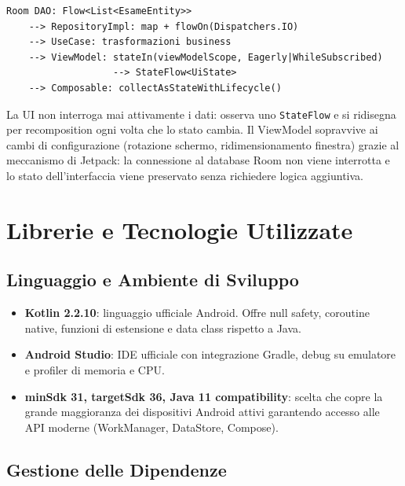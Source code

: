 \documentclass[a4paper,12pt]{report}
\begin{document}
    \begin{lstlisting}[language={},basicstyle=\ttfamily\small]
Room DAO: Flow<List<EsameEntity>>
    --> RepositoryImpl: map + flowOn(Dispatchers.IO)
    --> UseCase: trasformazioni business
    --> ViewModel: stateIn(viewModelScope, Eagerly|WhileSubscribed)
                   --> StateFlow<UiState>
    --> Composable: collectAsStateWithLifecycle()
    \end{lstlisting}

    La UI non interroga mai attivamente i dati: osserva uno \texttt{StateFlow}
    e si ridisegna per recomposition ogni volta che lo stato cambia.
    Il ViewModel sopravvive ai cambi di configurazione (rotazione schermo,
    ridimensionamento finestra) grazie al meccanismo di Jetpack: la connessione
    al database Room non viene interrotta e lo stato dell'interfaccia viene
    preservato senza richiedere logica aggiuntiva.

    \section{Librerie e Tecnologie Utilizzate}

    \subsection{Linguaggio e Ambiente di Sviluppo}

    \begin{itemize}
        \item \textbf{Kotlin 2.2.10}: linguaggio ufficiale Android. Offre null safety,
        coroutine native, funzioni di estensione e data class rispetto a Java.
        \item \textbf{Android Studio}: IDE ufficiale con integrazione Gradle, debug su
        emulatore e profiler di memoria e CPU.
        \item \textbf{minSdk 31, targetSdk 36, Java 11 compatibility}: scelta che copre
        la grande maggioranza dei dispositivi Android attivi garantendo accesso alle API
        moderne (WorkManager, DataStore, Compose).
    \end{itemize}

    \subsection{Gestione delle Dipendenze}
\end{document}
